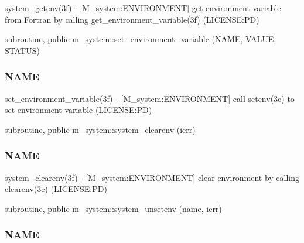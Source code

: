\begin{DoxyCompactItemize}
\begin{DoxyCompactList}
system\+\_\+getenv(3f) -\/ \mbox{[}M\+\_\+system\+:E\+N\+V\+I\+R\+O\+N\+M\+E\+NT\mbox{]} get environment variable from Fortran by calling get\+\_\+environment\+\_\+variable(3f) (L\+I\+C\+E\+N\+SE\+:PD) \end{DoxyCompactList}\item 
subroutine, public \mbox{\hyperlink{namespacem__system_ad813765403a5d9d6fb7a2edcb669fe4b}{m\+\_\+system\+::set\+\_\+environment\+\_\+variable}} (N\+A\+ME, V\+A\+L\+UE, S\+T\+A\+T\+US)
\begin{DoxyCompactList}\small\item\em \subsubsection*{N\+A\+ME}

set\+\_\+environment\+\_\+variable(3f) -\/ \mbox{[}M\+\_\+system\+:E\+N\+V\+I\+R\+O\+N\+M\+E\+NT\mbox{]} call setenv(3c) to set environment variable (L\+I\+C\+E\+N\+SE\+:PD) \end{DoxyCompactList}\item 
subroutine, public \mbox{\hyperlink{namespacem__system_a9c34787b170ab8d41000d7c3acb60736}{m\+\_\+system\+::system\+\_\+clearenv}} (ierr)
\begin{DoxyCompactList}\small\item\em \subsubsection*{N\+A\+ME}

system\+\_\+clearenv(3f) -\/ \mbox{[}M\+\_\+system\+:E\+N\+V\+I\+R\+O\+N\+M\+E\+NT\mbox{]} clear environment by calling clearenv(3c) (L\+I\+C\+E\+N\+SE\+:PD) \end{DoxyCompactList}\item 
subroutine, public \mbox{\hyperlink{namespacem__system_a61b67b46b35490ec308773b65c3376a3}{m\+\_\+system\+::system\+\_\+unsetenv}} (name, ierr)
\begin{DoxyCompactList}\small\item\em \subsubsection*{N\+A\+ME}


\end{DoxyCompactList}
\end{DoxyCompactItemize}

